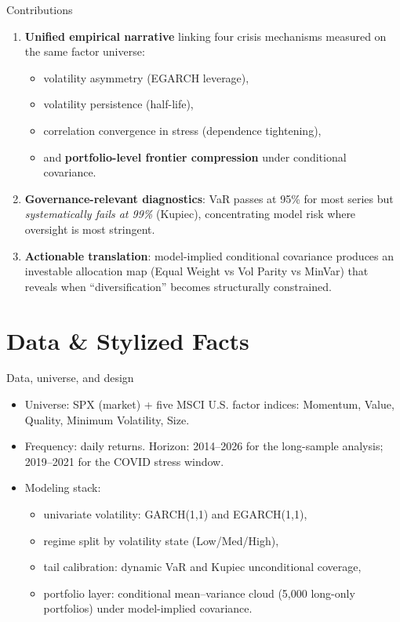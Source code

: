 \documentclass[10pt,aspectratio=169]{beamer}
\newcommand{\sm}{\small}
\begin{document}
\begin{frame}{Contributions}
\sm
\begin{enumerate}
  \item \textbf{Unified empirical narrative} linking four crisis mechanisms measured on the same factor universe:
    \begin{itemize}
      \item volatility asymmetry (EGARCH leverage),
      \item volatility persistence (half-life),
      \item correlation convergence in stress (dependence tightening),
      \item and \textbf{portfolio-level frontier compression} under conditional covariance.
    \end{itemize}
  \item \textbf{Governance-relevant diagnostics}: VaR passes at 95\% for most series but \emph{systematically fails at 99\%} (Kupiec), concentrating model risk where oversight is most stringent.
  \item \textbf{Actionable translation}: model-implied conditional covariance produces an investable allocation map (Equal Weight vs Vol Parity vs MinVar) that reveals when ``diversification'' becomes structurally constrained.
\end{enumerate}
\end{frame}

\section{Data \& Stylized Facts}

\begin{frame}{Data, universe, and design}
\sm
\begin{itemize}
  \item Universe: SPX (market) + five MSCI U.S. factor indices: Momentum, Value, Quality, Minimum Volatility, Size.
  \item Frequency: daily returns. Horizon: 2014--2026 for the long-sample analysis; 2019--2021 for the COVID stress window.
  \item Modeling stack:
  \begin{itemize}
    \item univariate volatility: GARCH(1,1) and EGARCH(1,1),
    \item regime split by volatility state (Low/Med/High),
    \item tail calibration: dynamic VaR and Kupiec unconditional coverage,
    \item portfolio layer: conditional mean--variance cloud (5,000 long-only portfolios) under model-implied covariance.
  \end{itemize}
\end{itemize}
\end{frame}
\end{document}
